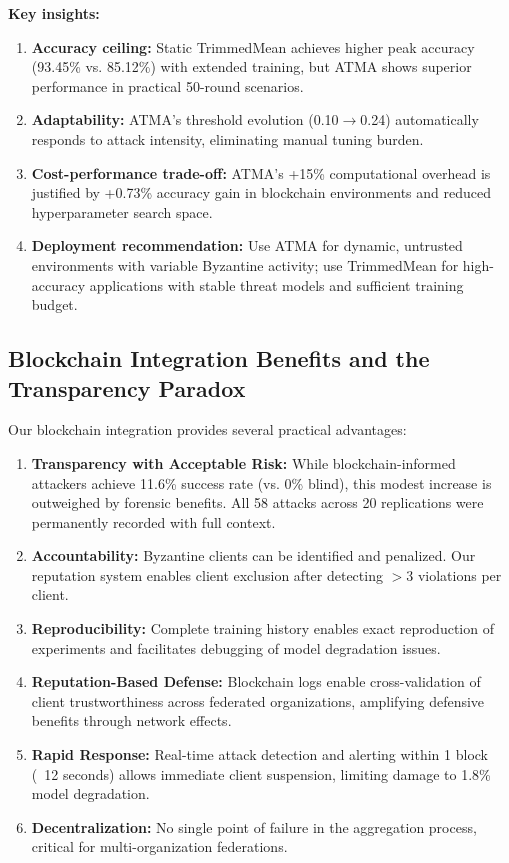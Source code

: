 \documentclass[12pt,a4paper,onecolumn]{article}
\begin{document}
\textbf{Key insights:}
\begin{enumerate}
    \item \textbf{Accuracy ceiling:} Static TrimmedMean achieves higher peak accuracy (93.45\% vs. 85.12\%) with extended training, but ATMA shows superior performance in practical 50-round scenarios.
    
    \item \textbf{Adaptability:} ATMA's threshold evolution (0.10$\to$0.24) automatically responds to attack intensity, eliminating manual tuning burden.
    
    \item \textbf{Cost-performance trade-off:} ATMA's +15\% computational overhead is justified by +0.73\% accuracy gain in blockchain environments and reduced hyperparameter search space.
    
    \item \textbf{Deployment recommendation:} Use ATMA for dynamic, untrusted environments with variable Byzantine activity; use TrimmedMean for high-accuracy applications with stable threat models and sufficient training budget.
\end{enumerate}

\subsection{Blockchain Integration Benefits and the Transparency Paradox}

Our blockchain integration provides several practical advantages:

\begin{enumerate}
    \item \textbf{Transparency with Acceptable Risk:} While blockchain-informed attackers achieve 11.6\% success rate (vs. 0\% blind), this modest increase is outweighed by forensic benefits. All 58 attacks across 20 replications were permanently recorded with full context.
    
    \item \textbf{Accountability:} Byzantine clients can be identified and penalized. Our reputation system enables client exclusion after detecting $>$3 violations per client.
    
    \item \textbf{Reproducibility:} Complete training history enables exact reproduction of experiments and facilitates debugging of model degradation issues.
    
    \item \textbf{Reputation-Based Defense:} Blockchain logs enable cross-validation of client trustworthiness across federated organizations, amplifying defensive benefits through network effects.
    
    \item \textbf{Rapid Response:} Real-time attack detection and alerting within 1 block (~12 seconds) allows immediate client suspension, limiting damage to 1.8\% model degradation.
    
    \item \textbf{Decentralization:} No single point of failure in the aggregation process, critical for multi-organization federations.
\end{enumerate}
\end{document}
